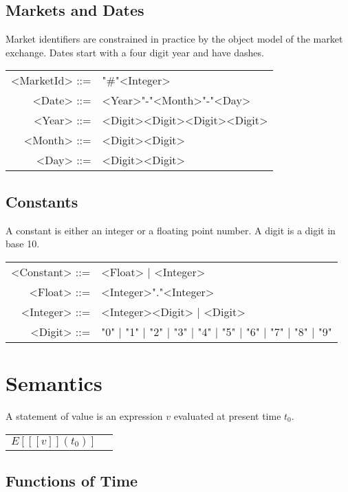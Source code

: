 \documentclass[a4paper,11pt]{article}
\newcommand{\sembrack}[1]{[\![#1]\!]}
\begin{document}
\subsection{Markets and Dates}

Market identifiers are constrained in practice by the object model of the market exchange. Dates start with a four digit year and have dashes.

\begin{tabular}{rl}
\\
<MarketId> ::= & "\#"<Integer> \\
<Date> ::= & <Year>"-"<Month>"-"<Day> \\
<Year> ::= & <Digit><Digit><Digit><Digit> \\
<Month> ::= & <Digit><Digit> \\
<Day> ::= & <Digit><Digit> \\
\end{tabular}

\subsection{Constants}

A constant is either an integer or a floating point number. A digit is a digit in base 10.

\begin{tabular}{rl}
\\
<Constant> ::= & <Float> | <Integer>\\
<Float> ::= & <Integer>"."<Integer> \\
<Integer> ::= & <Integer><Digit> | <Digit>\\
<Digit> ::= & "0" | "1" | "2" | "3" | "4" | "5" | "6" | "7" | "8" | "9" \\
\end{tabular}

\section{Semantics}

A statement of value is an expression $v$ evaluated at present time $t_0$.

\begin{tabular}{rl}
\\
$ E[ \sembrack{v}(t_0) ]$ \\
\end{tabular}


\subsection{Functions of Time}
\end{document}
